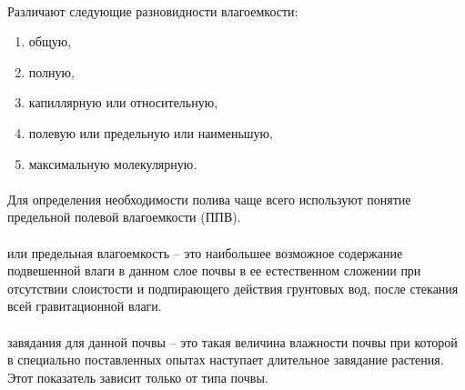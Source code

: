 \paragraph*{}Различают следующие разновидности влагоемкости:

\begin{enumerate}

\item общую, 
\item полную, 
\item капиллярную или относительную, 
\item полевую или предельную или наименьшую, 
\item максимальную молекулярную.

\end{enumerate}

\paragraph*{}Для определения необходимости полива чаще всего используют понятие предельной полевой влагоемкости (ППВ). 


\paragraph*{} или предельная влагоемкость -- это наибольшее возможное содержание подвешенной влаги в данном слое почвы в ее естественном сложении при отсутствии слоистости и подпирающего действия грунтовых вод, после стекания всей гравитационной влаги.

\paragraph*{} завядания для данной почвы -- это такая величина влажности почвы при которой в специально поставленных опытах наступает длительное завядание растения. Этот показатель зависит только от типа почвы. 

\paragraph*{}

